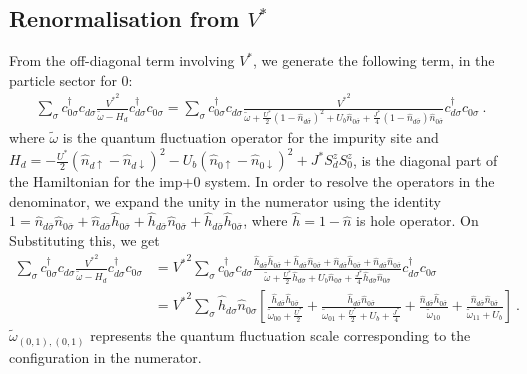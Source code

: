 \subsection{Renormalisation from \({V^*}\)}
From the off-diagonal term involving \({V^*}\), we generate the following term, in the particle sector for \(0\):
\begin{eqnarray}
\sum_\sigma c^\dagger_{0\sigma}c_{d\sigma} \frac{{V^*}^2}{\tilde \omega - H_d} c^\dagger_{d\sigma}c_{0\sigma} = \sum_\sigma c^\dagger_{0\sigma}c_{d\sigma} \frac{{V^*}^2}{\tilde \omega + \frac{U^*}{2}\left( 1 - \hat n_{d\bar\sigma} \right)^2 + U_b \hat n_{0\bar\sigma} + \frac{J^*}{4}\left( 1 - \hat n_{d\bar\sigma} \right) \hat n_{0\bar\sigma} } c^\dagger_{d\sigma}c_{0\sigma}~.
\end{eqnarray}
where \(\tilde \omega\) is the quantum fluctuation operator for the impurity site and \(H_d = -\frac{U^*}{2}\left( \hat n_{d \uparrow} - \hat n_{d \downarrow} \right)^2 - U_b \left( \hat n_{0 \uparrow} - \hat n_{0 \downarrow} \right)^2 + J^*S_d^z S_0^z \), is the diagonal part of the Hamiltonian for the imp+0 system. In order to resolve the operators in the denominator, we expand the unity in the numerator using the identity \(1 = \hat n_{d\bar\sigma}\hat n_{0\bar\sigma} + \hat n_{d\bar\sigma}\hat h_{0\bar\sigma} + \hat h_{d\bar\sigma}\hat n_{0\bar\sigma} + \hat h_{d\bar\sigma}\hat h_{0\bar\sigma}\), where \(\hat h = 1 - \hat n\) is hole operator. On Substituting this, we get
\begin{eqnarray}
	\sum_\sigma  c^\dagger_{0\sigma}c_{d\sigma} \frac{{V^*}^2}{\tilde \omega - H_d} c^\dagger_{d\sigma}c_{0\sigma} &= {V^*}^2 \sum_\sigma c^\dagger_{0\sigma}c_{d\sigma} \frac{\hat h_{d\bar\sigma}\hat h_{0\bar\sigma} + \hat h_{d\bar\sigma}\hat n_{0\bar\sigma} + \hat n_{d\bar\sigma}\hat h_{0\bar\sigma} + \hat n_{d\bar\sigma}\hat n_{0\bar\sigma}}{\tilde \omega + \frac{U^*}{2}\hat h_{d\bar\sigma} + U_b \hat n_{0\bar\sigma} + \frac{J^*}{4}\hat h_{d\bar\sigma} \hat n_{0\bar\sigma} } c^\dagger_{d\sigma}c_{0\sigma}\nonumber\\
														       &= {V^*}^2 \sum_\sigma \hat h_{d\sigma} \hat n_{0\sigma}\left[\frac{\hat h_{d\bar\sigma}\hat h_{0\bar\sigma}}{\tilde\omega_{00} + \frac{U^*}{2}} + \frac{\hat h_{d\bar\sigma}\hat n_{0\bar\sigma}}{\tilde\omega_{01} + \frac{U^*}{2} + U_b + \frac{J^*}{4}} + \frac{\hat n_{d\bar\sigma}\hat h_{0\bar\sigma}}{\tilde\omega_{10}} + \frac{\hat n_{d\bar\sigma}\hat n_{0\bar\sigma}}{\tilde\omega_{11} + U_b}\right]~.\qquad
\end{eqnarray}
\(\tilde\omega_{(0,1),(0,1)}\) represents the quantum fluctuation scale corresponding to the configuration in the numerator.

